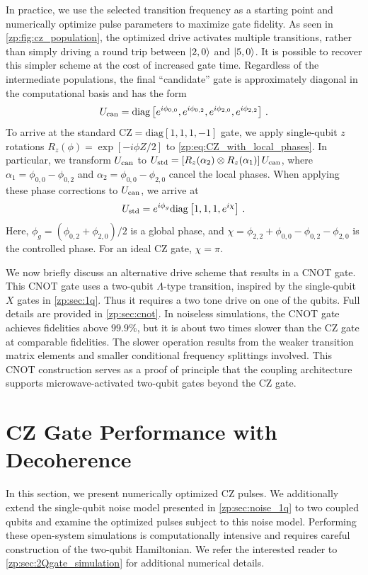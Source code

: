 In practice, we use the selected transition frequency as a starting point and numerically optimize pulse parameters to maximize gate fidelity.
As seen in \cref{zp:fig:cz_population}, the optimized drive activates multiple transitions, rather than simply driving a round trip between $\ket{2,0}$ and $\ket {5,0}$.
It is possible to recover this simpler scheme at the cost of increased gate time.
Regardless of the intermediate populations, the final ``candidate'' gate is approximately diagonal in the computational basis and has the form
\begin{equation}\label{zp:eq:CZ_with_local_phases}
U_{\rm can} =  \mathrm{diag}\left[ e^{i \phi_{0,0}}, e^{i \phi_{0,2}}, e^{i \phi_{2,0}}, e^{i \phi_{2,2}}\right]\,.
\end{equation}
To arrive at the standard $ \text{CZ} =\mathrm{diag}[1,1,1,-1]$ gate, we apply single-qubit $z$ rotations  $R_z(\phi)=\exp[-i \phi Z/2] $ to \cref{zp:eq:CZ_with_local_phases}.
In particular, we transform $U_{\rm can} $ to  $U_{\rm std} = \left[ R_z(\alpha_2) \otimes R_z(\alpha_1) \right] U_{\rm can} $, where $\alpha_1 = \phi_{0,0}-\phi_{0,2}$ and $\alpha_2 = \phi_{0,0}-\phi_{2,0}$ cancel the local phases.
When applying these phase corrections to $U_{\rm can}$, we arrive at
\begin{equation}
U_{\rm std} = e^{i \phi_g}\mathrm{diag} \left[ 1, 1, 1, e^{i\chi} \right] \, .
\end{equation}
Here, $\phi_g= (\phi_{0,2} +\phi_{2,0})/2$ is a global phase, and $\chi = \phi_{2,2}+ \phi_{0,0} - \phi_{0,2}- \phi_{2,0}$ is the controlled phase.
For an ideal CZ gate, $\chi=\pi$.

We now briefly discuss an alternative drive scheme that results in a CNOT gate.
This CNOT gate uses a two-qubit $\Lambda$-type transition, inspired by the single-qubit $X$ gates in \cref{zp:sec:1q}.
Thus it requires a two tone drive on one of the qubits.
Full details are provided in \cref{zp:sec:cnot}.
In noiseless simulations, the CNOT gate achieves fidelities above $99.9\%$, but it is about two times slower than the CZ gate at comparable fidelities.
The slower operation results from the weaker transition matrix elements and smaller conditional frequency splittings involved.
This CNOT construction serves as a proof of principle that the coupling architecture supports microwave-activated two-qubit gates beyond the CZ gate.

\section{CZ Gate Performance with Decoherence} \label{zp:sec:fidelity_2q}
In this section, we present numerically optimized CZ pulses.
We additionally extend the single-qubit noise model presented in \cref{zp:sec:noise_1q} to two coupled qubits and examine the optimized pulses subject to this noise model.
Performing these open-system simulations is computationally intensive and requires careful construction of the two-qubit Hamiltonian.
We refer the interested reader to \cref{zp:sec:2Qgate_simulation} for additional numerical details.

